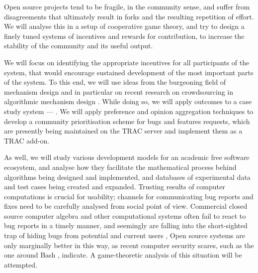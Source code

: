 \begin{workpackage}[id=social-aspects,wphases=0-48,
  title=Social Aspects,
  lead=UO,
  UORM=53,USHRM=8, USORM=5]
\begin{wpdescription}
Open source projects tend to be fragile, in the community sense, and
suffer from disagreements that ultimately result in forks and the
resulting repetition of effort. We will analyse this in a setup of
cooperative game theory, and try to design a finely tuned systems of
incentives and rewards for contribution, to increase the stability of
the community and its useful output.

We will focus on identifying the appropriate incentives for all
participants of the system, that would encourage sustained development
of the most important parts of the system.  To this end, we will use
ideas from the burgeoning field of mechanism design \cite{AGTbook} and
in particular on recent research on crowdsourcing in algorithmic
mechanism design \cite{crowds}.  While doing so, we will apply
outcomes to a case study system --- \Sage.  We will apply preference
and opinion aggregation techniques \cite{pref-aggr} to develop a
community prioritisation scheme for \Sage bugs and features requests,
which are presently being maintained on the \Sage TRAC server
\cite{trac-sagemath} and implement them as a TRAC \cite{Trac} add-on.

As well, we will study various development models for an academic free
software ecosystem, and analyse how they facilitate the mathematical
process behind algorithms being designed and implemented, and
databases of experimental data and test cases being created and
expanded.  Trusting results of computer computations is crucial for
usability; channels for communicating bug reports and fixes need to be
carefully analysed from social point of view.  Commercial closed
source computer algebra and other computational systems often fail to
react to bug reports in a timely manner, and seemingly are falling
into the short-sighted trap of hiding bugs from potential and current
users \cite{misfort}, Open source systems are only marginally better
in this way, as recent computer security scares, such as the one
around Bash \cite{shellshock}, indicate.  A game-theoretic analysis of
this situation will be attempted.
\end{wpdescription}


\end{workpackage}
